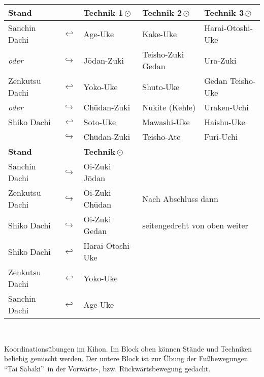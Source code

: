 \setcounter{num}{0}
\setcounter{numz}{0}
\setlength{\tabcolsep}{3pt}		
\begin{tcolorbox}[width=\textwidth,height=\textheight,right=12pt,left=12pt,colframe=GKD,colback=white,fonttitle=\bfseries,coltitle=white,title=Allgemeines:\indent Ergänzungen / Basiskombinationen]
	\null\vfill\null
	\begin{tabularx}{\textwidth}{llXXX}
		\textbf{Stand} 		& & \textbf{Technik 1\,\(\odot\)} 	& \textbf{Technik 2\,\(\odot\)} 	& \textbf{Technik 3\,\(\odot\)}\\
		\midrule
		Sanchin Dachi 		& \(\hookleftarrow\)	& Age-Uke				& Kake-Uke 				& Harai-Otoshi-Uke	\\
		\textit{oder}		& \(\hookrightarrow\) 	& J\={o}dan-Zuki 		& Teisho-Zuki Gedan		& Ura-Zuki			\\
		Zenkutsu Dachi		& \(\hookleftarrow\)	& Yoko-Uke 				& Shuto-Uke 			& Gedan Teisho-Uke	\\
		\textit{oder}		& \(\hookrightarrow\)	& Ch\={u}dan-Zuki 		& Nukite (Kehle) 		& Uraken-Uchi		\\
		Shiko Dachi			& \(\hookleftarrow\)	& Soto-Uke 				& Mawashi-Uke 			& Haishu-Uke		\\
		& \(\hookrightarrow\)	& Ch\={u}dan-Zuki	& Teisho-Ate 			& Furi-Uchi			\\
		\midrule
		\textbf{Stand} 		& & \textbf{Technik\,\(\odot\)} 		&  						&\\
		\midrule
		Sanchin Dachi 		& \(\hookrightarrow\)	& Oi-Zuki J\={o}dan 	&  						&\\
		Zenkutsu Dachi		& \(\hookrightarrow\)	& Oi-Zuki Ch\={u}dan 	&\multicolumn{2}{l}{Nach Abschluss dann}\\
		Shiko Dachi			& \(\hookrightarrow\)	& Oi-Zuki Gedan 		&\multicolumn{2}{l}{seitengedreht von oben weiter}\\
		Shiko Dachi			& \(\hookleftarrow\)	& Harai-Otoshi-Uke 		&  						&\\
		Zenkutsu Dachi		& \(\hookleftarrow\)	& Yoko-Uke 				&  						&\\
		Sanchin Dachi		& \(\hookleftarrow\)	& Age-Uke 				&  						&\\
	\end{tabularx}\\\null\vfill\null
	\setlength{\tabcolsep}{6pt}	
	\begin{center}
		\parbox{\textwidth-2\tabcolsep}{Koordinationsübungen im Kihon. Im Block oben können Stände und Techniken beliebig gemischt werden. Der untere Block ist zur Übung der Fußbewegungen \textquotedblleft Tai Sabaki\textquotedblright~in der Vorwärts-, bzw. Rückwärtsbewegung gedacht.}
	\end{center}\null\vfill\null
\end{tcolorbox}
